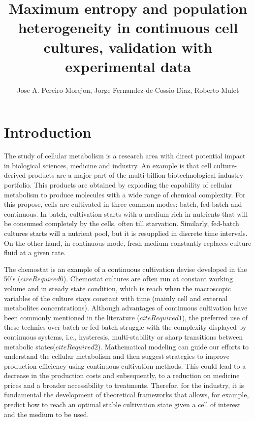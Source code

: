 \documentclass[]{article}
\title{Maximum entropy and population heterogeneity in 
	continuous cell cultures, validation with experimental data}
\author{Jose A. Pereiro-Morejon, Jorge Fernandez-de-Cossio-Diaz, Roberto Mulet }
\begin{document}
	
	\maketitle
	
	\section{Introduction}
	The study of cellular metabolism is a research area with direct potential impact in biological sciences, medicine and industry.
	An example is that cell culture-derived products are a major part of the multi-billion biotechnological industry portfolio. 
	This products are obtained by exploding the capability of cellular metabolism to produce molecules with a wide range of chemical complexity. 
	For this propose, cells are cultivated in three common modes: batch, fed-batch and continuous. 
	In batch, cultivation starts with a medium rich in nutrients that will be consumed completely by the cells, often till starvation. 
	Similarly, fed-batch cultures starts will a nutrient pool, but it is resupplied in discrete time intervals. 
	On the other hand, in continuous mode, fresh medium constantly replaces culture fluid at a given rate.
	
	The chemostat is an example of a continuous cultivation devise developed in the 50's ($cireRequired6$). 
	Chemostat cultures are often run at constant working volume and in steady state condition, which is reach when the macroscopic variables of the culture stays constant with time (mainly cell and external metabolites concentrations). 	
	Although advantages of continuous
cultivation have been commonly mentioned in the literature ($citeRequired1$), the preferred use of these technics over batch or fed-batch struggle with the complexity displayed by continuous systems, i.e., hysteresis, multi-stability or sharp transitions between metabolic states($citeRequired2$). 
	Mathematical modeling can guide our efforts to understand the cellular metabolism and then suggest strategies to improve production efficiency using continuous cultivation methods. 
	This could lead to a decrease in the production costs and subsequently, to a reduction on medicine prices and a broader accessibility to treatments.
	Therefor, for the industry, it is fundamental the development of theoretical frameworks that allows, for example, predict how to reach an optimal stable cultivation state given a cell of interest and the medium to be used. 
	
\end{document}
